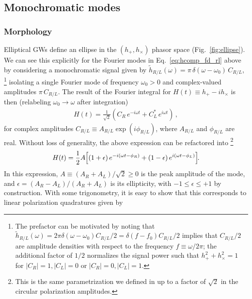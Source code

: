 \documentclass[aps,prd,twocolumn,superscriptaddress,preprintnumbers,floatfix,nofootinbib]{revtex4-2}
\begin{document}
\subsection{Monochromatic modes}
\label{sec:ellip:mono}

\subsubsection{Morphology}

Elliptical GWs define an ellipse in the $\left(h_+, h_\times\right)$ phasor space (Fig.~\ref{fig:ellipse}).
We can see this explicitly for the Fourier modes in Eq.~\eqref{eq:hcomp_fd_rl} above by considering a monochromatic signal given by $\tilde{h}_{R/L}(\omega) = \pi\, \delta(\omega-\omega_0)\, C_{R/L} $,%
\footnote{The prefactor can be motivated by noting that $\tilde{h}_{R/L}(\omega) = 2\pi \delta(\omega - \omega_0) C_{R/L}/2 = \delta(f - f_0) C_{R/L} / 2$ implies that $C_{R/L}/2$ are amplitude densities with respect to the frequency $f \equiv \omega/2\pi$; the additional factor of $1/2$ normalizes the signal power such that $h_+^2 + h_\times^2 = 1$ for $|C_R|=1, |C_L|=0$ or $|C_R|=0, |C_L|=1$.}
isolating a single Fourier mode of frequency $\omega_0 >0$ and complex-valued amplitudes $\pi\, C_{R/L}$.
The result of the Fourier integral for $H(t) \equiv h_+ - i h_\times$ is then (relabeling $\omega_0 \to \omega$ after integration)
\begin{align} \label{eq:ellip_circ}
H(t) =\frac{1}{\sqrt{2}} \left( C_R\, e^{-i \omega t} + C^*_L\, e^{i\omega t}\right)\, ,
\end{align}
for complex amplitudes $C_{R/L} \equiv A_{R/L} \exp(i\phi_{R/L})$, where $A_{R/L}$ and $\phi_{R/L}$ are real.
Without loss of generality, the above expression can be refactored into%
\footnote{This is the same parametrization we defined in \cite{Isi:2021iql} up to a factor of $\sqrt{2}$ in the circular polarization amplitudes.}
\begin{align}
H(t) = \frac{1}{2}A\hspace{-2pt}\left[ \left(1+\epsilon\right) e^{-i (\omega t - \phi_R)} + \left(1-\epsilon\right) e^{i (\omega t - \phi_L)} \right]\hspace{-3pt} .
\end{align}
In this expression, 
$A \equiv (A_R + A_L)/ \sqrt{2} \geq 0$ is the peak amplitude of the mode, and $\epsilon = (A_R - A_L)/(A_R + A_L)$ is its ellipticity, with $-1 \leq \epsilon \leq +1$ by construction.
With some trigonometry, it is easy to show that this corresponds to linear polarization quadratures given by
\end{document}
